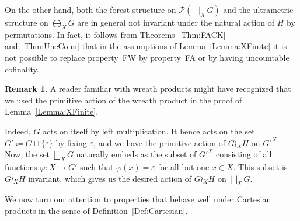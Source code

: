 \documentclass[a4paper]{article}
\theoremstyle{definition}
\newtheorem{rem}[lem]{Remark}
\newcommand*{\FW}{FW}
\newcommand*{\FA}{FA}
\newcommand*{\powerset}[1]{\mathcal P(#1)}
\begin{document}
On the other hand, both the forest structure on $\powerset{\bigsqcup_XG}$ and the ultrametric structure on $\bigoplus_XG$ are in general not invariant under the natural action of $H$ by permutations.
In fact, it follows from Theorems~\ref{Thm:FACK} and~\ref{Thm:UncCoun} that in the assumptions of Lemma~\ref{Lemma:XFinite} it is not possible to replace property~\FW{} by property~\FA{} or by having uncountable cofinality.
%
%
\begin{rem}\label{Rem:Actionsb}
A reader familiar with wreath products might have recognized that we used the primitive action of the wreath product in the proof of Lemma~\ref{Lemma:XFinite}.

Indeed, $G$ acts on itself by left multiplication.
It hence acts on the set $G'\coloneqq G\sqcup\{\varepsilon\}$ by fixing $\varepsilon$, and we have the primitive action of $G\wr_{X} H$ on $G'^X$.
Now, the set $\bigsqcup_XG$ naturally embeds as the subset of $G'^X$ consisting of all functions $\varphi\colon X\to G'$ such that $\varphi(x)=\varepsilon$ for all but one $x\in X$.
This subset is $G\wr_{X} H$ invariant, which gives us the desired action of $G\wr_{X} H$ on $\bigsqcup_XG$.
\end{rem}
%
%
We now turn our attention to properties that behave well under Cartesian products in the sense of Definition~\ref{Def:Cartesian}.
\end{document}
